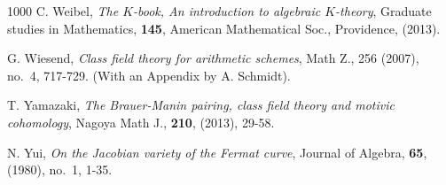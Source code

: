 \documentclass[12pt]{amsart}
\theoremstyle{remark}
\renewcommand{\1}{{\mathbb{S}}}
\newcommand{\<}{\langle}
\renewcommand{\>}{\rangle}
\begin{document}
\begin{thebibliography}{1000}
 C. Weibel, {\sl The $K$-book, An introduction to algebraic
$K$-theory\/}, Graduate studies in Mathematics, {\bf 145},
American Mathematical Soc., Providence, (2013). \

 G. Wiesend, {\sl Class field theory for arithmetic schemes\/}, Math Z., 256 (2007), no.~4, 717-729. (With an Appendix by A. Schmidt). \ 




 T. Yamazaki, {\sl The Brauer-Manin pairing, class field theory and motivic cohomology\/}, Nagoya Math J., \textbf{210}, (2013), 29-58. \ 
	
 N. Yui, {\sl On the {J}acobian variety of the {F}ermat curve\/}, Journal of Algebra, \textbf{65}, (1980), no.~1, 1-35. \ 	
		
	\end{thebibliography}
	
	
\end{document}
